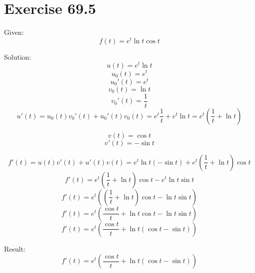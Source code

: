 \documentclass[a4paper, 10pt]{scrartcl}
\begin{document}
\section{Exercise 69.5}

Given:
\[f(t) = e^{t}\ln{t}\cos{t}\]

Solution:
\[u(t) = e^{t}\ln{t}\]
\[u_{0}(t) = e^{t}\]
\[u_{0}'(t) = e^{t}\]
\[v_{0}(t) = \ln{t}\]
\[v_{0}'(t) = \frac{1}{t}\]
\[u'(t) = u_{0}(t)v_{0}'(t) + u_{0}'(t)v_{0}(t) =
          e^{t}\frac{1}{t} + e^{t}\ln{t} =
          e^{t}(\frac{1}{t} + \ln{t})\]

\[v(t) = \cos{t}\]
\[v'(t) = -\sin{t}\]

\[f'(t) = u(t)v'(t) + u'(t)v(t) = e^{t}\ln{t}(-\sin{t}) + e^{t}(\frac{1}{t} + \ln{t})\cos{t}\]
\[f'(t) = e^{t}(\frac{1}{t} + \ln{t})\cos{t} - e^{t}\ln{t}\sin{t}\]
\[f'(t) = e^{t}\left((\frac{1}{t} + \ln{t})\cos{t} - \ln{t}\sin{t}\right)\]
\[f'(t) = e^{t}\left(\frac{\cos{t}}{t} + \ln{t}\cos{t} - \ln{t}\sin{t}\right)\]
\[f'(t) = e^{t}\left(\frac{\cos{t}}{t} + \ln{t}(\cos{t} - \sin{t})\right)\]

Result:
\[f'(t) = e^{t}\left(\frac{\cos{t}}{t} + \ln{t}(\cos{t} - \sin{t})\right)\]
\end{document}
